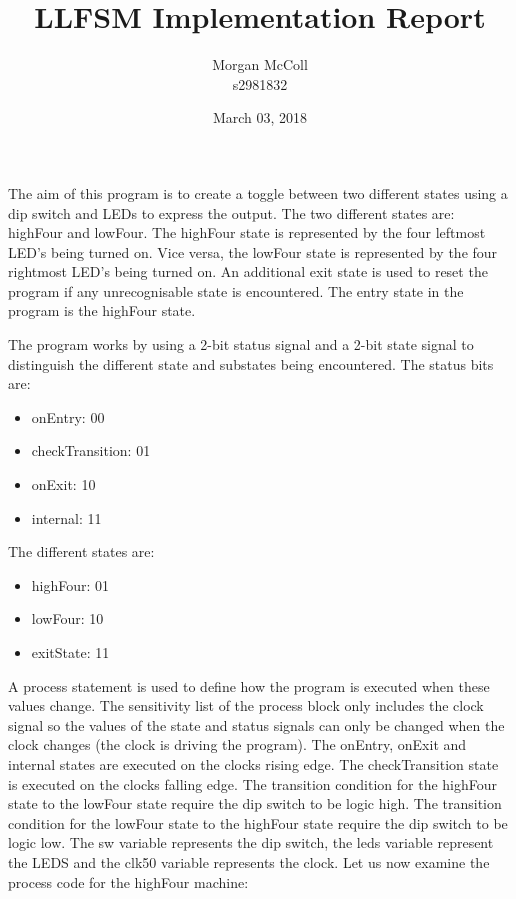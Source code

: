 \documentclass{article}
\begin{document}
	\title{LLFSM Implementation Report}
	\author{Morgan McColl \\s2981832}
	\date{March 03, 2018}
	\maketitle
	
	The aim of this program is to create a toggle between two different states using a dip switch and LEDs to express the output. The two different states are: highFour and lowFour. The highFour state is represented by the four leftmost LED's being turned on. Vice versa, the lowFour state is represented by the four rightmost LED's being turned on. An additional exit state is used to reset the program if any unrecognisable state is encountered. The entry state in the program is the highFour state.
	
	The program works by using a 2-bit status signal and a 2-bit state signal to distinguish the different state and substates being encountered. The status bits are:
	\begin{itemize}
		\item onEntry: 00
		\item checkTransition: 01
		\item onExit: 10
		\item internal: 11
	\end{itemize}
	
	The different states are:
	\begin{itemize}
		\item highFour: 01
		\item lowFour: 10
		\item exitState: 11
	\end{itemize}
	
	A process statement is used to define how the program is executed when these values change. The sensitivity list of the process block only includes the clock signal so the values of the state and status signals can only be changed when the clock changes (the clock is driving the program). The onEntry, onExit and internal states are executed on the clocks rising edge. The checkTransition state is executed on the clocks falling edge. The transition condition for the highFour state to the lowFour state require the dip switch to be logic high. The transition condition for the lowFour state to the highFour state require the dip switch to be logic low. The sw variable represents the dip switch, the leds variable represent the LEDS and the clk50 variable represents the clock. Let us now examine the process code for the highFour machine:
	
\end{document}
